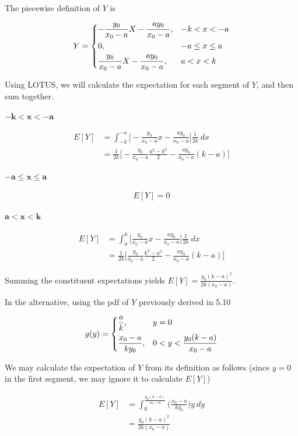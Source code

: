 \documentclass[10pt, oneside]{article}
\begin{document}
\begin{enumerate}[label=7.\arabic*]
\begin{enumerate}
	The piecewise definition of $Y$ is
	
	\[ Y = \begin{dcases}
	-\frac{y_0}{x_0 - a} X - \frac{ay_0}{x_0 - a}, & -k < x < -a \\
	0, &-a \leq x \leq a \\
	\frac{y_0}{x_0 - a} X - \frac{ay_0}{x_0 - a}, &a < x < k
	\end{dcases} \]
	
	Using LOTUS, we will calculate the expectation for each segment of $Y$, and then sum together.
	
	$\bm{ -k < x < -a }$
	
	\begin{align*}
	E[Y] &= \int^{-a}_{-k} \Big[ -\frac{y_0}{x_0-a} x - \frac{ay_0}{x_0-a} \Big] \frac{1}{2k} \ dx \\
	&= \frac{1}{2k} \Big[ -\frac{y_0}{x_0 - a} \frac{a^2-k^2}{2} - \frac{ay_0}{x_0 - a} (k-a) \Big]
	\end{align*}
	
	$\bm{-a \leq x \leq a}$
	
	\begin{align*}
	E[Y] = 0
	\end{align*}
	
	$\bm{a < x < k}$
	
	\begin{align*}
	E[Y] &= \int^k_a \Big[ \frac{y_0}{x_0 - a} x - \frac{ay_0}{x_0 - a} \Big] \frac{1}{2k} \ dx \\
	&= \frac{1}{2k} \Big[ \frac{y_0}{x_0 - a} \frac{k^2 - a^2}{2} - \frac{ay_0}{x_0 - a} (k - a) \Big]
	\end{align*}
	
	Summing the constituent expectations yields $\boxed{E[Y] = \frac{y_0 (k-a)^2}{2k (x_0 - a)}}$.
	
	In the alternative, using the pdf of $Y$ previously derived in 5.10
	
	\[ g(y) = \begin{dcases}
	\frac{a}{k}, & y = 0 \\
	\frac{x_0 - a}{k y_0}, & 0 < y < \frac{y_0 (k-a)}{x_0 - a}
	\end{dcases} \]
	
	We may calculate the expectation of $Y$ from its definition as follows (since $y=0$ in the first segment, we may ignore it to calculate $E[Y]$)
	
	\begin{align*}
	E[Y] &= \int^{\frac{y_0 (k-a)}{x_0 - a}}_0 \Big( \frac{x_0 - a}{k y_0} \Big) y \ dy \\
	&= \boxed{\frac{y_0 (k-a)^2}{2k (x_0 - a)}}
	\end{align*}
	

\end{enumerate}
\end{enumerate}
\end{document}
